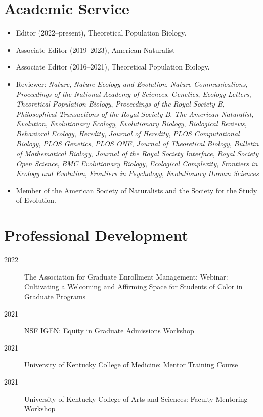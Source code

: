 \documentclass[11pt]{article}
\begin{document}
  \section{Academic Service}
  \begin{itemize}
    \item Editor (2022--present), Theoretical Population Biology.
    \item Associate Editor (2019--2023), American Naturalist
    \item Associate Editor (2016--2021), Theoretical Population Biology.
    \item Reviewer: \textit{Nature}, \textit{Nature Ecology and Evolution}, \textit{Nature Communications}, \textit{Proceedings of the National Academy of Sciences}, \textit{Genetics}, \textit{Ecology Letters}, \textit{Theoretical Population Biology}, \textit{Proceedings of the Royal Society B}, \textit{Philosophical Transactions of the Royal Society B}, \textit{The American Naturalist}, \textit{Evolution}, \textit{Evolutionary Ecology}, \textit{Evolutionary Biology}, \textit{Biological Reviews}, \textit{Behavioral Ecology}, \textit{Heredity}, \textit{Journal of Heredity}, \textit{PLOS Computational Biology}, \textit{PLOS Genetics}, \textit{PLOS ONE}, \textit{Journal of Theoretical Biology}, \textit{Bulletin of Mathematical Biology}, \textit{Journal of the Royal Society Interface}, \textit{Royal Society Open Science}, \textit{BMC Evolutionary Biology}, \textit{Ecological Complexity}, \textit{Frontiers in Ecology and Evolution}, \textit{Frontiers in Psychology}, \textit{Evolutionary Human Sciences}
  \item Member of the American Society of Naturalists and the Society for the Study of Evolution.
  \end{itemize}
  

  \section{Professional Development}
  \begin{description}
    \item[2022] The Association for Graduate Enrollment Management: Webinar: Cultivating a Welcoming and Affirming Space for Students of Color in Graduate Programs
    \item[2021] NSF IGEN: Equity in Graduate Admissions Workshop
    \item[2021] University of Kentucky College of Medicine: Mentor Training Course
    \item[2021] University of Kentucky College of Arts and Sciences: Faculty Mentoring Workshop
  \end{description}
\end{document}
